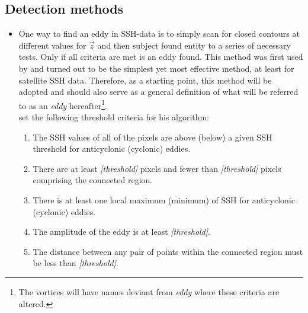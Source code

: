 \subsection{Detection methods} \label{subsec:detectmethods}
\begin{itemize}
	\item
	One way to find an eddy in SSH-data is to simply scan for closed contours at different values for $\vec{z}$ and then subject found entity to a series of necessary tests. Only if all criteria are met is an eddy found. This method was first used by \citet{Chelton2011} and turned out to be the simplest yet most effective method, at least for satellite SSH data. Therefore, as a starting point, this method will be adopted and should also serve as a general definition of what will be referred to as an \textit{eddy} hereafter\footnote{The vortices will have names deviant from \textit{eddy} where these criteria are altered.}.\\
	\citeauthor{Chelton2011} set the following threshold criteria for his algorithm:
\begin{enumerate}
\item
The SSH values of all of the pixels are above (below) a given SSH threshold for anticyclonic (cyclonic) eddies.
\item
There are at least \textit{[threshold]} pixels and fewer than \textit{[threshold]} pixels comprising the connected region.
\item
There is at least one local maximum (minimum) of SSH for anticyclonic (cyclonic) eddies.
\item
 The amplitude of the eddy is at least \textit{[threshold]}.
\item
The distance between any pair of points within the connected region must be less than \textit{[threshold]}.
\end{enumerate}


\end{itemize}
